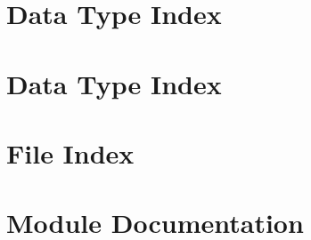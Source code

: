 \documentclass[twoside]{book}
\newcommand{\+}{\discretionary{\mbox{\scriptsize$\hookleftarrow$}}{}{}}
\begin{document}
\chapter{Data Type Index}

\chapter{Data Type Index}

\chapter{File Index}

\chapter{Module Documentation}


















































\end{document}
